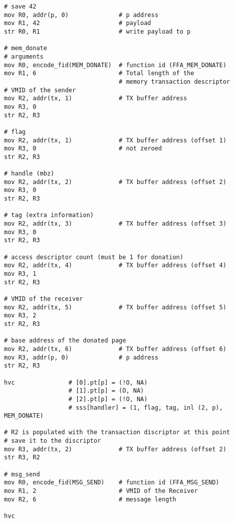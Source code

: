 \documentclass{article}
\begin{document}
\begin{lstlisting}[caption={VM 1}]
# save 42
mov R0, addr(p, 0)              # p address
mov R1, 42                      # payload
str R0, R1                      # write payload to p

# mem_donate
# arguments
mov R0, encode_fid(MEM_DONATE)  # function id (FFA_MEM_DONATE)
mov R1, 6                       # Total length of the  
                                # memory transaction descriptor
# VMID of the sender 
mov R2, addr(tx, 1)             # TX buffer address                               
mov R3, 0
str R2, R3

# flag
mov R2, addr(tx, 1)             # TX buffer address (offset 1)                               
mov R3, 0                       # not zeroed
str R2, R3

# handle (mbz)
mov R2, addr(tx, 2)             # TX buffer address (offset 2)
mov R3, 0
str R2, R3

# tag (extra information)
mov R2, addr(tx, 3)             # TX buffer address (offset 3)
mov R3, 0
str R2, R3

# access descriptor count (must be 1 for donation)
mov R2, addr(tx, 4)             # TX buffer address (offset 4)
mov R3, 1
str R2, R3

# VMID of the receiver
mov R2, addr(tx, 5)             # TX buffer address (offset 5)
mov R3, 2
str R2, R3

# base address of the donated page
mov R2, addr(tx, 6)             # TX buffer address (offset 6)
mov R3, addr(p, 0)              # p address
str R2, R3

hvc               # [0].pt[p] = (!O, NA)
                  # [1].pt[p] = (O, NA)
                  # [2].pt[p] = (!O, NA)
                  # sss[handler] = (1, flag, tag, inl (2, p), MEM_DONATE)

# R2 is populated with the transaction discriptor at this point
# save it to the discriptor
mov R3, addr(tx, 2)             # TX buffer address (offset 2)
str R3, R2

# msg_send
mov R0, encode_fid(MSG_SEND)    # function id (FFA_MSG_SEND)
mov R1, 2                       # VMID of the Receiver
mov R2, 6                       # message length

hvc
\end{lstlisting}
\end{document}
